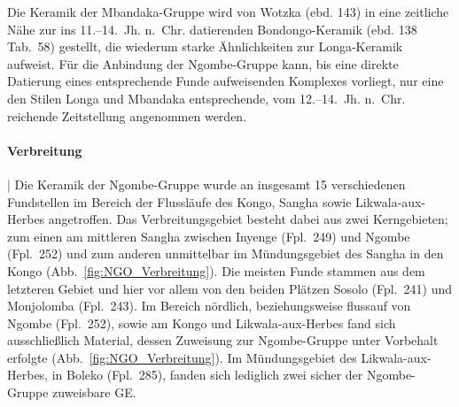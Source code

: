 Die Keramik der Mbandaka-Gruppe wird von Wotzka (ebd. 143) in eine zeitliche Nähe zur ins 11.--14.~Jh. n.~Chr. datierenden Bondongo-Keramik (ebd. 138 Tab.~58) gestellt, die wiederum starke Ähnlichkeiten zur Longa-Keramik aufweist. Für die Anbindung der Ngombe-Gruppe kann, bis eine direkte Datierung eines entsprechende Funde aufweisenden Komplexes vorliegt, nur eine den Stilen Longa und Mbandaka entsprechende, vom 12.--14.~Jh. n.~Chr. reichende Zeitstellung angenommen werden.

\paragraph{Verbreitung}\hspace{-.5em}|\hspace{.5em}%
Die Keramik der Ngombe-Gruppe wurde an insgesamt 15 verschiedenen Fundstellen im Bereich der Flussläufe des Kongo, \mbox{Sangha} sowie \mbox{Likwala}-\mbox{aux}-\mbox{Herbes} angetroffen. Das Verbreitungsgebiet besteht dabei aus zwei Kerngebieten; zum einen am mittleren \mbox{Sangha} zwischen Inyenge (Fpl.~249) und Ngombe (Fpl.~252) und zum anderen unmittelbar im Mündungsgebiet des \mbox{Sangha} in den Kongo (Abb.~\ref{fig:NGO_Verbreitung}). Die meisten Funde stammen aus dem letzteren Gebiet und hier vor allem von den beiden Plätzen Sosolo (Fpl.~241) und Monjolomba (Fpl.~243). Im Bereich nördlich, beziehungsweise flussauf von Ngombe (Fpl.~252), sowie am Kongo und \mbox{Likwala}-\mbox{aux}-\mbox{Herbes} fand sich ausschließlich Material, dessen Zuweisung zur Ngombe-Gruppe unter Vorbehalt erfolgte (Abb.~\ref{fig:NGO_Verbreitung}). Im Mündungsgebiet des Likwala-aux-Herbes, in Boleko (Fpl.~285), fanden sich lediglich zwei sicher der Ngombe-Gruppe zuweisbare GE.